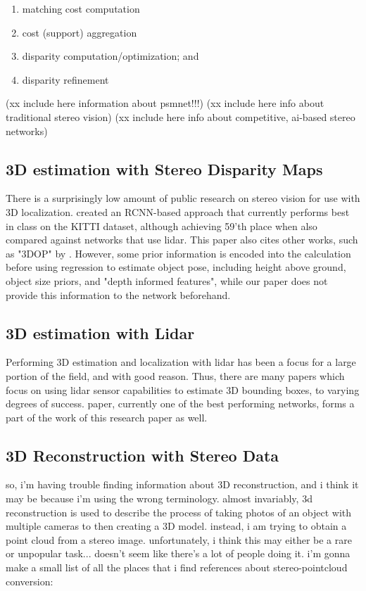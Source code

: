 \begin{enumerate} \itemsep=-0.5em
    \item matching cost computation
    \item cost (support) aggregation
    \item disparity computation/optimization; and
    \item disparity refinement
    
\end{enumerate}

(xx include here information about psmnet!!!)
(xx include here info about traditional stereo vision)
(xx include here info about competitive, ai-based stereo networks)




\subsection{3D estimation with Stereo Disparity Maps}
There is a surprisingly low amount of public research on stereo vision for use with 3D localization. \cite{li_stereo_2019} created an RCNN-based approach that currently performs best in class on the KITTI dataset, although achieving 59'th place when also compared against networks that use lidar. This paper also cites other works, such as "3DOP" by \cite{chen_3d_2016}. However, some prior information is encoded into the calculation before using regression to estimate object pose, including height above ground, object size priors, and "depth informed features", while our paper does not provide this information to the network beforehand.




\subsection{3D estimation with Lidar}
Performing 3D estimation and localization with lidar has been a focus for a large portion of the field, and with good reason. Thus, there are many papers which focus on using lidar sensor capabilities to estimate 3D bounding boxes, to varying degrees of success. \cite{qi_frustum_2017} paper, currently one of the best performing networks, forms a part of the work of this research paper as well. 

\subsection{3D Reconstruction with Stereo Data}
so, i'm having trouble finding information about 3D reconstruction, and i think it may be because i'm using the wrong terminology. almost invariably, 3d reconstruction is used to describe the process of taking photos of an object with multiple cameras to then creating a 3D model. instead, i am trying to obtain a point cloud from a stereo image. unfortunately, i think this may either be a rare or unpopular task... doesn't seem like there's a lot of people doing it. i'm gonna make a small list of all the places that i find references about stereo-pointcloud conversion: 


